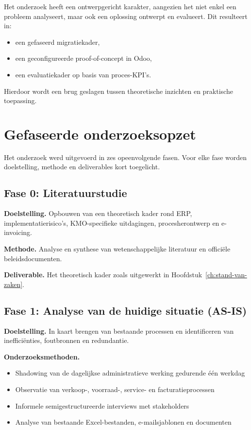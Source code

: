 Het onderzoek heeft een ontwerpgericht karakter, aangezien het niet enkel een probleem analyseert, maar ook een oplossing ontwerpt en evalueert. Dit resulteert in:

\begin{itemize}
    \item een gefaseerd migratiekader,
    \item een geconfigureerde proof-of-concept in Odoo,
    \item een evaluatiekader op basis van proces-KPI’s.
\end{itemize}

Hierdoor wordt een brug geslagen tussen theoretische inzichten en praktische toepassing.

\section{Gefaseerde onderzoeksopzet}

Het onderzoek werd uitgevoerd in zes opeenvolgende fasen. Voor elke fase worden doelstelling, methode en deliverables kort toegelicht.

\subsection{Fase 0: Literatuurstudie}

\textbf{Doelstelling.}  
Opbouwen van een theoretisch kader rond ERP, implementatierisico’s, KMO-specifieke uitdagingen, procesherontwerp en e-invoicing.

\textbf{Methode.}  
Analyse en synthese van wetenschappelijke literatuur en officiële beleidsdocumenten.

\textbf{Deliverable.}  
Het theoretisch kader zoals uitgewerkt in Hoofdstuk~\ref{ch:stand-van-zaken}.

\subsection{Fase 1: Analyse van de huidige situatie (AS-IS)}

\textbf{Doelstelling.}  
In kaart brengen van bestaande processen en identificeren van inefficiënties, foutbronnen en redundantie.

\textbf{Onderzoeksmethoden.}
\begin{itemize}
    \item Shadowing van de dagelijkse administratieve werking gedurende één werkdag
    \item Observatie van verkoop-, voorraad-, service- en facturatieprocessen
    \item Informele semigestructureerde interviews met stakeholders
    \item Analyse van bestaande Excel-bestanden, e-mailsjablonen en documenten
\end{itemize}

